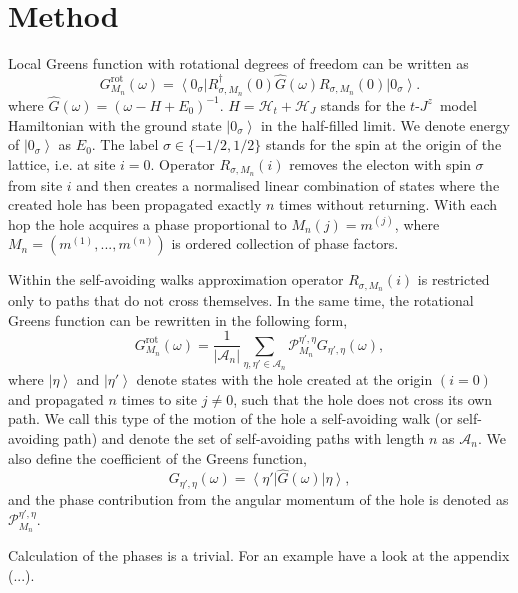 \documentclass[11pt, a4paper, twocolumn]{article}
\newcommand{\tjzm}{$t$-$J^z$~model}
\newcommand{\ket}[1]{\left\vert #1 \right\rangle}
\newcommand{\bra}[1]{\left\langle #1 \right\vert}
\newcommand{\abs}[1]{\left\vert #1 \right\vert}
\begin{document}
\section{Method}
Local Greens function with rotational degrees of freedom can be written as
\begin{equation}
    G^{\text{rot}}_{M_n}(\omega) = 
    \bra{0_\sigma}R^{\dag}_{\sigma,M_n}(0) 
        \hat{G}(\omega)
    R_{\sigma,M_n}(0) \ket{0_\sigma}.
\end{equation}
where $\hat{G}(\omega) = (\omega - H + E_0)^{-1}$.  $H = \mathcal{H}_t + \mathcal{H}_J$ stands for the \tjzm{} Hamiltonian with the ground state $\ket{0_\sigma}$ in the half-filled limit. We denote energy of $\ket{0_\sigma}$ as $E_0$. The label $\sigma \in \{-1/2, 1/2\}$ stands for the spin at the origin of the lattice, i.e. at site $i = 0$. Operator $R_{\sigma,M_n}(i)$ removes the electon with spin $\sigma$ from site $i$ and then creates a normalised linear combination of states where the created hole has been propagated exactly $n$ times without returning. With each hop the hole acquires a phase proportional to $M_n(j) = m^{(j)}$, where $M_n = (m^{(1)}, ..., m^{(n)})$ is ordered collection of phase factors.

Within the self-avoiding walks approximation operator $R_{\sigma,M_n}(i)$ is restricted only to paths that do not cross themselves. In the same time, the rotational Greens function can be rewritten in the following form,
\begin{equation}
    G^{\text{rot}}_{M_n}(\omega) = 
    \frac{1}{\abs{\mathcal{A}_n}}\sum_{\eta, \eta' \in \mathcal{A}_n}
	\mathcal{P}_{M_n}^{\eta',\eta}
        G_{\eta', \eta}(\omega),
\end{equation}
where $\ket{\eta}$ and $\ket{\eta'}$ denote states with the hole created at the origin $(i = 0)$ and propagated $n$ times to site $j \neq 0$, such that the hole does not cross its own path. We call this type of the motion of the hole a self-avoiding walk (or self-avoiding path) and denote the set of self-avoiding paths with length $n$ as $\mathcal{A}_n$. We also define the coefficient of the Greens function,
\begin{equation}
    G_{\eta', \eta}(\omega) = \bra{\eta'}\hat{G}(\omega)\ket{\eta},
\end{equation}
and the phase contribution from the angular momentum of the hole is denoted as $\mathcal{P}_{M_n}^{\eta',\eta}$. 

Calculation of the phases is a trivial. For an example have a look at the appendix (...). 
\end{document}
